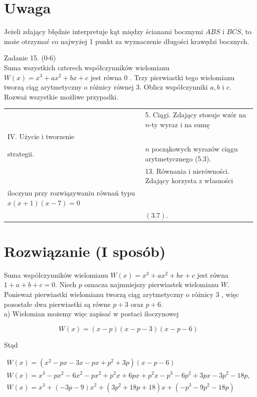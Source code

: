 \documentclass[10pt]{article}
\begin{document}
\section*{Uwaga}
Jeżeli zdający błędnie interpretuje kąt między ścianami bocznymi $A B S$ i $B C S$, to może otrzymać co najwyżej 1 punkt za wyznaczenie długości krawędzi bocznych.

Zadanie 15. (0-6)\\
Suma wszystkich czterech współczynników wielomianu $W(x)=x^{3}+a x^{2}+b x+c$ jest równa 0 . Trzy pierwiastki tego wielomianu tworzą ciąg arytmetyczny o różnicy równej 3. Oblicz współczynniki $a, b$ i $c$. Rozważ wszystkie możliwe przypadki.

\begin{center}
\begin{tabular}{|l|l|}
\hline
 & 5. Ciągi. Zdający stosuje wzór na $n$-ty wyraz i na sumę \\
IV. Użycie i tworzenie &  \\
strategii. & $n$ począkowych wyrazów ciągu arytmetycznego (5.3). \\
 & 13. Równania i nierówności. Zdający korzysta z własności \\
iloczynu przy rozwiązywaniu równań typu $x(x+1)(x-7)=0$ &  \\
 & $(3.7)$. \\
\end{tabular}
\end{center}

\section*{Rozwiązanie (I sposób)}
Suma współczynników wielomianu $W(x)=x^{3}+a x^{2}+b x+c$ jest równa $1+a+b+c=0$. Niech $p$ oznacza najmniejszy pierwiastek wielomianu $W$. Ponieważ pierwiastki wielomianu tworzą ciąg arytmetyczny o różnicy 3 , więc pozostałe dwa pierwiastki są równe $p+3$ oraz $p+6$.\\
a) Wielomian możemy więc zapisać w postaci iloczynowej

$$
W(x)=(x-p)(x-p-3)(x-p-6)
$$

Stąd

$$
\begin{gathered}
W(x)=\left(x^{2}-p x-3 x-p x+p^{2}+3 p\right)(x-p-6) \\
W(x)=x^{3}-p x^{2}-6 x^{2}-p x^{2}+p^{2} x+6 p x+p^{2} x-p^{3}-6 p^{2}+3 p x-3 p^{2}-18 p, \\
W(x)=x^{3}+(-3 p-9) x^{2}+\left(3 p^{2}+18 p+18\right) x+\left(-p^{3}-9 p^{2}-18 p\right)
\end{gathered}
$$
\end{document}
